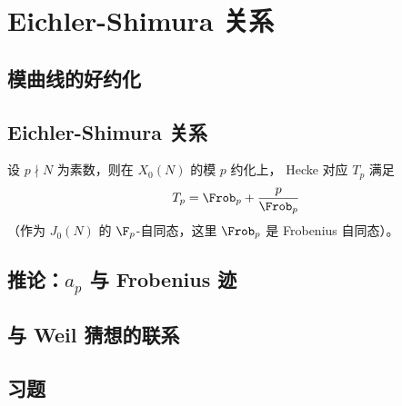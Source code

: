 \chapter{Eichler-Shimura 关系}
\label{ch:eichler-shimura}

\section{模曲线的好约化}


\section{Eichler-Shimura 关系}

\begin{theorem}
设 $p \nmid N$ 为素数，则在 $X_0(N)$ 的模 $p$ 约化上，
Hecke 对应 $T_p$ 满足
\[
  T_p = \Frob_p + \frac{p}{\Frob_p}
\]
（作为 $J_0(N)$ 的 $\F_p$-自同态，这里 $\Frob_p$ 是 Frobenius 自同态）。
\end{theorem}


\section{推论：$a_p$ 与 Frobenius 迹}


\section{与 Weil 猜想的联系}


\section{习题}
